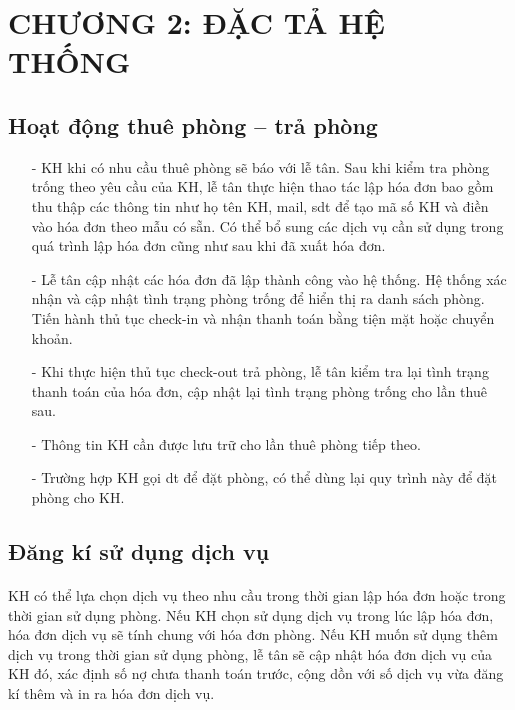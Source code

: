 
\fontsize{16}{20}\selectfont
\section*{CHƯƠNG 2: ĐẶC TẢ HỆ THỐNG}
\fontsize{14}{20}\selectfont
\setcounter{section}{2}
\subsection{Hoạt động thuê phòng – trả phòng}
\fontsize{13}{13}\selectfont
\begin{itemize}

    \item[-] KH khi có nhu cầu thuê phòng sẽ báo với lễ tân. Sau khi kiểm tra phòng trống theo yêu cầu của KH, lễ tân thực hiện thao tác lập hóa đơn bao gồm thu thập các thông tin như họ tên KH, mail, sdt để tạo mã số KH và điền vào hóa đơn theo mẫu có sẵn. Có thể bổ sung các dịch vụ cần sử dụng trong quá trình lập hóa đơn cũng như sau khi đã xuất hóa đơn. 
    \item[-] Lễ tân cập nhật các hóa đơn đã lập thành công vào hệ thống. Hệ thống xác nhận và cập nhật tình trạng phòng trống để hiển thị ra danh sách phòng. Tiến hành thủ tục check-in và nhận thanh toán bằng tiện mặt hoặc chuyển khoản.
    \item[-]Khi thực hiện thủ tục check-out trả phòng, lễ tân kiểm tra lại tình trạng thanh toán của hóa đơn, cập nhật lại tình trạng phòng trống cho lần thuê sau.
    \item[-]Thông tin KH cần được lưu trữ cho lần thuê phòng tiếp theo.
    \item[-]Trường hợp KH gọi dt để đặt phòng, có thể dùng lại quy trình này để đặt phòng cho KH.
    
\end{itemize}

\fontsize{14}{20}\selectfont
\subsection{Đăng kí sử dụng dịch vụ}
\fontsize{13}{20}\selectfont
\paragraph{}
KH có thể lựa chọn dịch vụ theo nhu cầu trong thời gian lập hóa đơn hoặc trong thời gian sử dụng phòng. Nếu KH chọn sử dụng dịch vụ trong lúc lập hóa đơn, hóa đơn dịch vụ sẽ tính chung với hóa đơn phòng. Nếu KH muốn sử dụng thêm dịch vụ trong thời gian sử dụng phòng, lễ tân sẽ cập nhật hóa đơn dịch vụ của KH đó, xác định số nợ chưa thanh toán trước, cộng dồn với số dịch vụ vừa đăng kí thêm và in ra hóa đơn dịch vụ.

